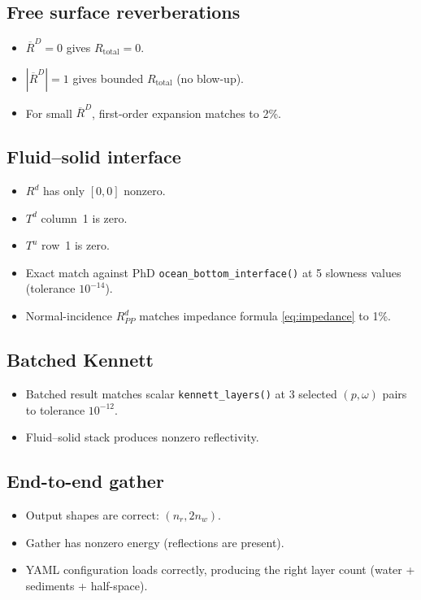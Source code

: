 \documentclass[11pt,a4paper]{article}
\begin{document}
\subsection{Free surface reverberations}

\begin{itemize}[nosep]
  \item $\overline{R}^D = 0$ gives $R_{\text{total}} = 0$.
  \item $|\overline{R}^D| = 1$ gives bounded $R_{\text{total}}$
    (no blow-up).
  \item For small $\overline{R}^D$, first-order expansion
    matches to 2\%.
\end{itemize}

\subsection{Fluid--solid interface}

\begin{itemize}[nosep]
  \item $R^d$ has only $[0,0]$ nonzero.
  \item $T^d$ column~1 is zero.
  \item $T^u$ row~1 is zero.
  \item Exact match against PhD \texttt{ocean\_bottom\_interface()}
    at 5 slowness values (tolerance $10^{-14}$).
  \item Normal-incidence $R^d_{PP}$ matches impedance formula
    \eqref{eq:impedance} to 1\%.
\end{itemize}

\subsection{Batched Kennett}

\begin{itemize}[nosep]
  \item Batched result matches scalar \texttt{kennett\_layers()} at
    3 selected $(p, \omega)$ pairs to tolerance $10^{-12}$.
  \item Fluid--solid stack produces nonzero reflectivity.
\end{itemize}

\subsection{End-to-end gather}

\begin{itemize}[nosep]
  \item Output shapes are correct: $(n_r, 2n_w)$.
  \item Gather has nonzero energy (reflections are present).
  \item YAML configuration loads correctly, producing the right
    layer count (water + sediments + half-space).
\end{itemize}
\end{document}
